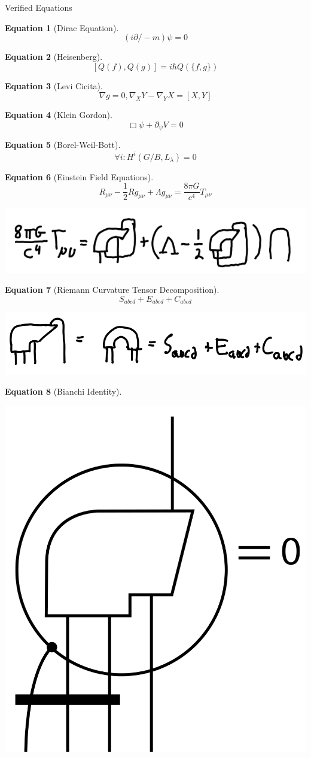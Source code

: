 \documentclass{article}
\theoremstyle{definition}
\newtheorem{equation1}{Equation}
\begin{document}
\begin{section}{Verified Equations}
  \begin{equation1}[Dirac Equation]
    $$(i{\partial\!\!\!\big /} - m) \psi = 0$$
  \end{equation1}

  \begin{equation1}[Heisenberg]
    $$[Q(f), Q(g)] = i\hbar Q(\{f,g\})$$
  \end{equation1}

  \begin{equation1}[Levi Cicita]
    $$\nabla g = 0,\nabla_X Y - \nabla_Y X = [X,Y]$$
  \end{equation1}

  \begin{equation1}[Klein Gordon]
    $$\Box \psi + \partial_{\psi}V = 0$$
  \end{equation1}

  \begin{equation1}[Borel-Weil-Bott]
    $$\forall i : H^i(G/B,L_\lambda) = 0$$
  \end{equation1}

  \begin{equation1}[Einstein Field Equations]
    $$R_{\mu\nu} - \frac{1}{2}Rg_{\mu\nu} + \Lambda g_{\mu\nu} = \frac{8\pi G}{c^4}T_{\mu\nu}$$
    \begin{center}
      \includegraphics[width=0.30\linewidth]{./einf.png}
    \end{center}
  \end{equation1}

  \begin{equation1}[Riemann Curvature Tensor Decomposition]
    $$S_{abcd} + E_{abcd} + C_{abcd}$$
    \begin{center}
      \includegraphics[width=0.30\linewidth]{./decomp.png}
    \end{center}
  \end{equation1}

  \begin{equation1}[Bianchi Identity]
    $\;$
    \newline
    \begin{center}
      \includegraphics[width=0.15\linewidth]{./bianchi.png}
    \end{center}
  \end{equation1}


\end{section}
\end{document}
